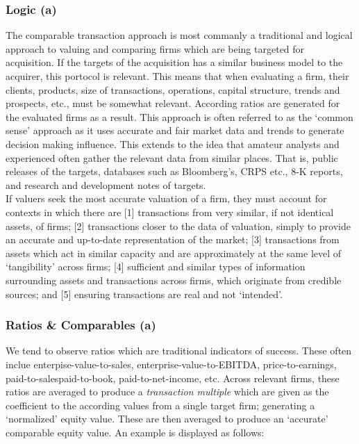 \documentclass[11pt, english]{article}
\begin{document}
                \subsubsection*{Logic (a)}

        The comparable transaction approach is most commanly a traditional and logical approach to valuing and comparing firms which are being targeted for acquisition. If the targets of the acquisition has a similar business model to the acquirer, this portocol is relevant. This means that when evaluating a firm, their clients, products, size of transactions, operations, capital structure, trends and prospects, etc., must be somewhat relevant. According ratios are generated for the evaluated firms as a result. This approach is often referred to as the `common sense' approach as it uses accurate and fair market data and trends to generate decision making influence. This extends to the idea that amateur analysts and experienced often gather the relevant data from similar places. That is, public releases of the targets, databases such as Bloomberg's, CRPS etc., 8-K reports, and research and development notes of targets.\\

        If valuers seek the most accurate valuation of a firm, they must account for contexts in which there are [1] transactions from very similar, if not identical assets, of firms; [2] transactions closer to the data of valuation, simply to provide an accurate and up-to-date representation of the market; [3] transactions from assets which act in similar capacity and are approximately at the same level of `tangibility' across firms; [4] sufficient and similar types of information surrounding assets and transactions across firms, which originate from credible sources; and [5] ensuring transactions are real and not `intended'.

                \subsubsection*{Ratios \& Comparables (a)}
        
        We tend to observe ratios which are traditional indicators of success. These often inclue enterpise-value-to-sales, enterprise-value-to-EBITDA, price-to-earnings, paid-to-salespaid-to-book, paid-to-net-income, etc. Across relevant firms, these ratios are averaged to produce a \textit{transaction multiple} which are given as the coefficient to the according values from a single target firm; generating a `normalized' equity value. These are then averaged to produce an `accurate' comparable equity value. An example is displayed as follows:
\end{document}

